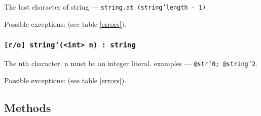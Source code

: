 The last character of string — \texttt{string.at (string'length - 1)}.

Possible exceptions:  (see table \ref{errors}).

\subsubsection{\texttt{[r/o] string'(<int> n) : string}}

The nth character. n must be an integer literal, examples — \texttt{@str'0; @string'2}.

Possible exceptions:  (see table \ref{errors}).

\subsection{Methods}

